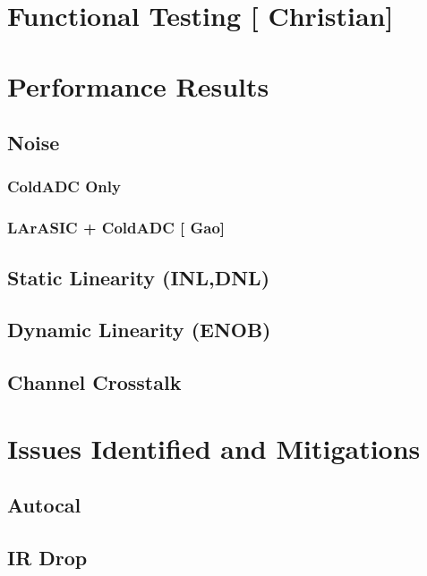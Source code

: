 \documentclass[12pt]{article}
\begin{document}

\section{Functional Testing [{\color{red} Christian}] }

	

\section{Performance Results}

\subsection{Noise}
\subsubsection{ColdADC Only}
\subsubsection{LArASIC + ColdADC  [{\color{red} Gao}] }

\subsection{Static Linearity (INL,DNL)}

\subsection{Dynamic Linearity (ENOB)}

\subsection{Channel Crosstalk}


\section{Issues Identified and Mitigations}

\subsection{Autocal}
\subsection{IR Drop}
\end{document}
